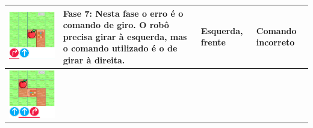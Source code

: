 \begin{quadro}
\begin{longtable}{ | m{} | m{} | m{} | m{} |}
         \includegraphics[width=.9\linewidth]{figs/debug/2.png} &
     
         \textbf{Fase 7}: 
         Nesta fase o erro é o comando de giro. O robô precisa girar à esquerda, mas o comando utilizado é o de girar à direita. &
 
         Esquerda, frente & Comando incorreto
         
         \\ \hline
     
     
         \includegraphics[width=.9\linewidth]{figs/debug/3.png} &
     

\end{longtable}
\end{quadro}

